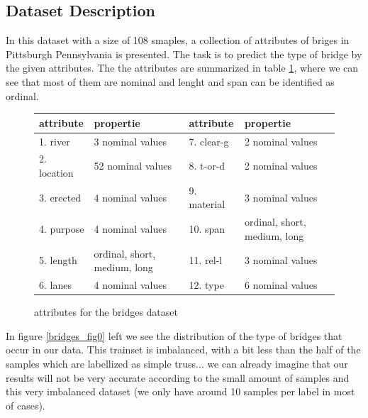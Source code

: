 \documentclass[11pt]{article}
\begin{document}
\subsection{Dataset Description}
In this dataset with a size of 108 smaples, a collection of attributes of briges in Pittsburgh Pennsylvania is presented. The task is to predict the type of bridge by the given attributes. The the attributes are summarized in table \ref{bridgetab_tab0}, where we can see that most of them are nominal and lenght and span can be identified as ordinal. 
%
\begin{figure}
  \begin{tabular}{ | l | l | l | l |}
    \hline
    attribute & propertie 				    & attribute   & propertie 				\\ \hline
    1. river 		 & 3 nominal values 		    & 7. clear-g 		 & 2 nominal values			\\ \hline
    2. location 	 & 52 nominal values 		    & 8. t-or-d  	 & 2 nominal values			\\ \hline
    3. erected 		 & 4 nominal values 		    & 9. material  	 & 3 nominal values			\\ \hline
    4. purpose 		 & 4 nominal values 		    & 10. span  	& ordinal, short, medium, long			\\ \hline
    5. length 		 & ordinal, short, medium, long & 11. rel-l       & 3 nominal values			\\ \hline
    6. lanes		 & 4 nominal values	  			& 12. type		 & 6 nominal values 			\\ \hline
  \end{tabular}
  \caption{attributes for the bridges dataset}
  \label{bridgetab_tab0}
\end{figure}
%
In figure \ref{bridges_fig0} left we see the distribution of the type of bridges that occur in our data. 
This trainset is imbalanced, with a bit less than the half of the samples which are labellized as simple truss... we can already imagine that our results will not be very accurate according to the small amount of samples and this very imbalanced dataset (we only have around 10 samples per label in most of cases). 
\end{document}
